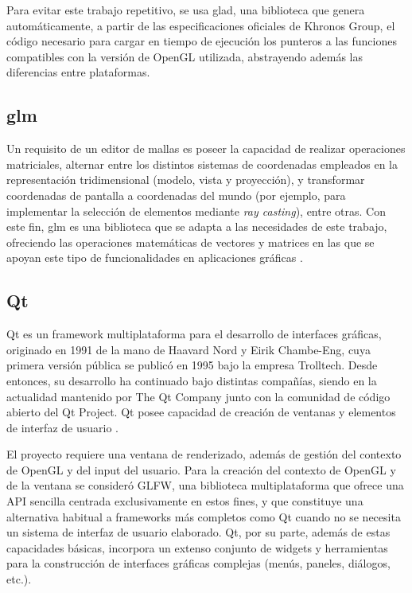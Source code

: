 Para evitar este trabajo repetitivo, se usa glad, una biblioteca que genera automáticamente, a partir de las especificaciones oficiales de Khronos Group, el código necesario para cargar en tiempo de ejecución los punteros a las funciones compatibles con la versión de OpenGL utilizada, abstrayendo además las diferencias entre plataformas.

\subsection{glm}

Un requisito de un editor de mallas es poseer la capacidad de realizar operaciones matriciales, alternar entre los distintos sistemas de coordenadas empleados en la representación tridimensional (modelo, vista y proyección), y transformar coordenadas de pantalla a coordenadas del mundo (por ejemplo, para implementar la selección de elementos mediante \emph{ray casting}), entre otras. Con este fin, glm es una biblioteca que se adapta a las necesidades de este trabajo, ofreciendo las operaciones matemáticas de vectores y matrices en las que se apoyan este tipo de funcionalidades en aplicaciones gráficas \cite{glm}.

\subsection{Qt}

Qt es un framework multiplataforma para el desarrollo de interfaces gráficas, originado en 1991 de la mano de Haavard Nord y Eirik Chambe-Eng, cuya primera versión pública se publicó en 1995 bajo la empresa Trolltech. Desde entonces, su desarrollo ha continuado bajo distintas compañías, siendo en la actualidad mantenido por The Qt Company junto con la comunidad de código abierto del Qt Project. Qt posee capacidad de creación de ventanas y elementos de interfaz de usuario \cite{qt, qt-history}.

El proyecto requiere una ventana de renderizado, además de gestión del contexto de OpenGL y del input del usuario. Para la creación del contexto de OpenGL y de la ventana se consideró GLFW, una biblioteca multiplataforma que ofrece una API sencilla centrada exclusivamente en estos fines, y que constituye una alternativa habitual a frameworks más completos como Qt cuando no se necesita un sistema de interfaz de usuario elaborado. Qt, por su parte, además de estas capacidades básicas, incorpora un extenso conjunto de widgets y herramientas para la construcción de interfaces gráficas complejas (menús, paneles, diálogos, etc.).

